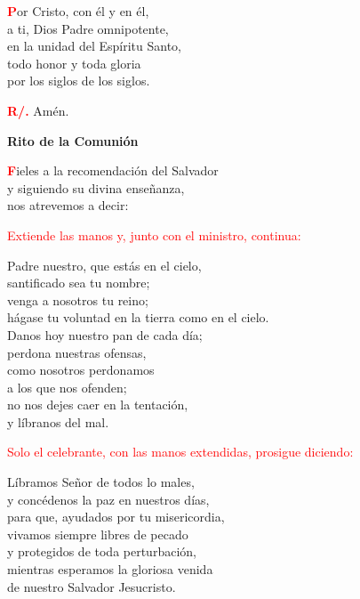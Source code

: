 \documentclass[12pt, letterpaper]{report}
\begin{document}
\lettrine[lines=2]{\bfseries \textcolor{red}{P}}{}\Large or Cristo, con \'el y en \'el,\\
a ti, Dios Padre omnipotente,\\
en la unidad del Esp\'iritu Santo,\\
todo honor y toda gloria\\
por los siglos de los siglos.

\Large \hspace{-0.9cm} {\bfseries \textcolor{red}{R/.}} \hspace{0.5cm} Am\'en.

\newpage

\begin{center}
\Huge {\bfseries Rito de la Comuni\'on}
\end{center}

\lettrine[lines=2]{\bfseries \textcolor{red}{F}}{}\Large ieles a la recomendaci\'on del Salvador\\
y siguiendo su divina ense\~nanza,\\
nos atrevemos a decir:

\large{\textcolor{red}{Extiende las manos y, junto con el ministro, continua:}}

\noindent
\Large Padre nuestro, que est\'as en el cielo,\\
santificado sea tu nombre;\\
venga a nosotros tu reino;\\
h\'agase tu voluntad en la tierra como en el cielo.\\
Danos hoy nuestro pan de cada d\'ia;\\
perdona nuestras ofensas,\\
como nosotros perdonamos\\
a los que nos ofenden;\\
no nos dejes caer en la tentaci\'on,\\
y l\'ibranos del mal.

\large{\textcolor{red}{Solo el celebrante, con las manos extendidas, prosigue diciendo:}}

\noindent
\Large L\'ibramos Se\~nor de todos lo males,\\ 
y conc\'edenos la paz en nuestros d\'ias,\\ 
para que, ayudados por tu misericordia,\\ 
vivamos siempre libres de pecado\\ 
y protegidos de toda perturbaci\'on,\\ 
mientras esperamos la gloriosa venida\\ 
de nuestro Salvador Jesucristo.
\end{document}
